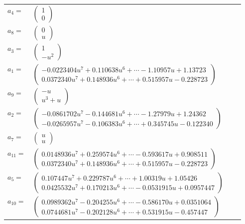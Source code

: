\documentclass[1p]{elsarticle_modified}
\theoremstyle{definition}
\begin{document}
\begin{tabular}{m{7pt} m{180pt} m{7pt} m{180pt} }
\flushright $a_{4}=$&$\begin{pmatrix}1\\0\end{pmatrix}$ \\
\flushright $a_{8}=$&$\begin{pmatrix}0\\u\end{pmatrix}$ \\
\flushright $a_{3}=$&$\begin{pmatrix}1\\- u^2\end{pmatrix}$ \\
\flushright $a_{1}=$&$\begin{pmatrix}-0.0223404 u^{7}+0.110638 u^{6}+\cdots-1.10957 u+1.13723\\0.0372340 u^{7}+0.148936 u^{6}+\cdots+0.515957 u-0.228723\end{pmatrix}$ \\
\flushright $a_{9}=$&$\begin{pmatrix}- u\\u^3+u\end{pmatrix}$ \\
\flushright $a_{2}=$&$\begin{pmatrix}-0.0861702 u^{7}-0.144681 u^{6}+\cdots-1.27979 u+1.24362\\-0.0265957 u^{7}-0.106383 u^{6}+\cdots+0.345745 u-0.122340\end{pmatrix}$ \\
\flushright $a_{7}=$&$\begin{pmatrix}u\\u\end{pmatrix}$ \\
\flushright $a_{11}=$&$\begin{pmatrix}0.0148936 u^{7}+0.259574 u^{6}+\cdots-0.593617 u+0.908511\\0.0372340 u^{7}+0.148936 u^{6}+\cdots+0.515957 u-0.228723\end{pmatrix}$ \\
\flushright $a_{5}=$&$\begin{pmatrix}0.107447 u^{7}+0.229787 u^{6}+\cdots+1.00319 u+1.05426\\0.0425532 u^{7}+0.170213 u^{6}+\cdots-0.0531915 u+0.0957447\end{pmatrix}$ \\
\flushright $a_{10}=$&$\begin{pmatrix}0.0989362 u^{7}-0.204255 u^{6}+\cdots-0.586170 u+0.0351064\\0.0744681 u^{7}-0.202128 u^{6}+\cdots+0.531915 u-0.457447\end{pmatrix}$ \\

\end{tabular}
\end{document}
